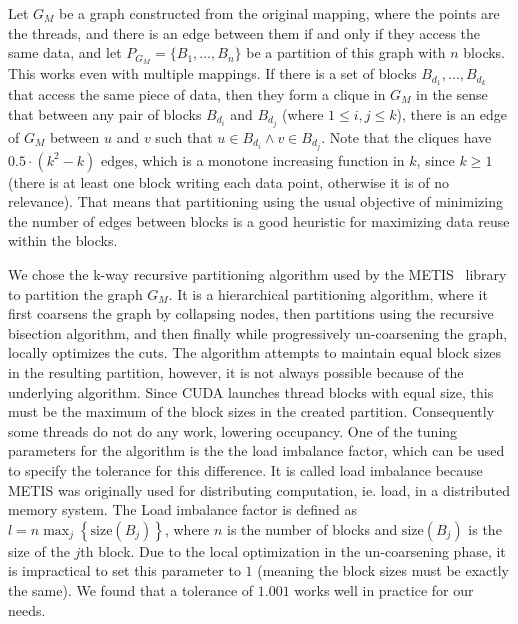 Let $G_M$ be a graph constructed from the original mapping, where the points are
the threads, and there is an edge between them if and only if they access the
same data, and let $P_{G_M} = \{B_1, \ldots, B_n\}$ be a partition of this graph
with $n$ blocks. This works even with multiple mappings. If there is a set of 
blocks $B_{d_1}, \ldots, B_{d_k}$ that access the same piece of data, then they 
form a clique in $G_M$ in the sense that between any pair of blocks $B_{d_i}$ 
and $B_{d_j}$ (where $1 \le i,j \le k$), there is an edge of $G_M$ between $u$ 
and $v$ such that $u \in B_{d_i} \wedge v \in B_{d_j}$. Note that the cliques 
have $0.5 \cdot (k^2 - k)$ edges, which is a monotone increasing function in 
$k$, since $k \ge 1$ (there is at least one block writing each data point, 
otherwise it is of no relevance). That means that partitioning using the usual 
objective of minimizing the number of edges between blocks is a good heuristic 
for maximizing data reuse within the blocks.

We chose the k-way recursive partitioning algorithm used by the 
METIS~\cite{metis} library to partition the graph $G_M$. It is a hierarchical
partitioning algorithm, where it first coarsens the graph by collapsing nodes, 
then partitions using the recursive bisection algorithm, and then finally while 
progressively un-coarsening the graph, locally optimizes the cuts. The algorithm 
attempts to maintain equal block sizes in the resulting partition, however, it 
is not always possible because of the underlying algorithm. Since CUDA launches 
thread blocks with equal size, this must be the maximum of the block sizes in 
the created partition. Consequently some threads do not do any work, 
lowering occupancy. One of the tuning parameters for the algorithm is the the 
load imbalance factor, which can be used to specify the tolerance for this 
difference. It is called load imbalance because METIS was originally used 
for distributing computation, ie. load, in a distributed memory system. The 
Load imbalance factor is defined as $l = n\max_j \left\{\mathrm{size}(B_j) 
\right\}$, where $n$ is the number of blocks and $\mathrm{size}(B_j)$ is the 
size of the $j$th block. Due to the local optimization in the un-coarsening 
phase, it is impractical to set this parameter to $1$ (meaning the block sizes 
must be exactly the same). We found that a tolerance of $1.001$ works well in 
practice for our needs.

